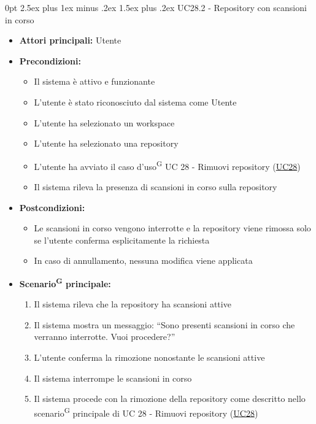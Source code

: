\documentclass[a4paper, 11pt]{article}
\makeatletter
\renewcommand\paragraph{\@startsection{paragraph}{4}
  {0pt}
  {2.5ex plus 1ex minus .2ex}
  {1.5ex plus .2ex}
  {\normalfont\normalsize\bfseries\color{AccentDark}}}
\makeatother
\begin{document}
\paragraph{UC28.2 - Repository con scansioni in corso} \label{UC28.2}
\begin{itemize}
	\item \textbf{Attori principali:} Utente
	\item \textbf{Precondizioni:}
	\begin{itemize}
		\item Il sistema è attivo e funzionante
		\item L'utente è stato riconosciuto dal sistema come Utente
		\item L'utente ha selezionato un workspace
		\item L'utente ha selezionato una repository
		\item L'utente ha avviato il caso d'uso\textsuperscript{G} UC 28 - Rimuovi repository (\hyperref[UC28]{UC28})
		\item Il sistema rileva la presenza di scansioni in corso sulla repository
	\end{itemize}
	\item \textbf{Postcondizioni:}
	\begin{itemize}
		\item Le scansioni in corso vengono interrotte e la repository viene rimossa solo se l'utente conferma esplicitamente la richiesta
		\item In caso di annullamento, nessuna modifica viene applicata
	\end{itemize}
	\item \textbf{Scenario\textsuperscript{G} principale:}
	\begin{enumerate}
		\item Il sistema rileva che la repository ha scansioni attive
		\item Il sistema mostra un messaggio: “Sono presenti scansioni in corso che verranno interrotte. Vuoi procedere?”
		\item L'utente conferma la rimozione nonostante le scansioni attive
		\item Il sistema interrompe le scansioni in corso
		\item Il sistema procede con la rimozione della repository come descritto nello scenario\textsuperscript{G} principale di UC 28 - Rimuovi repository (\hyperref[UC28]{UC28})
	\end{enumerate}
\end{itemize}
\end{document}
